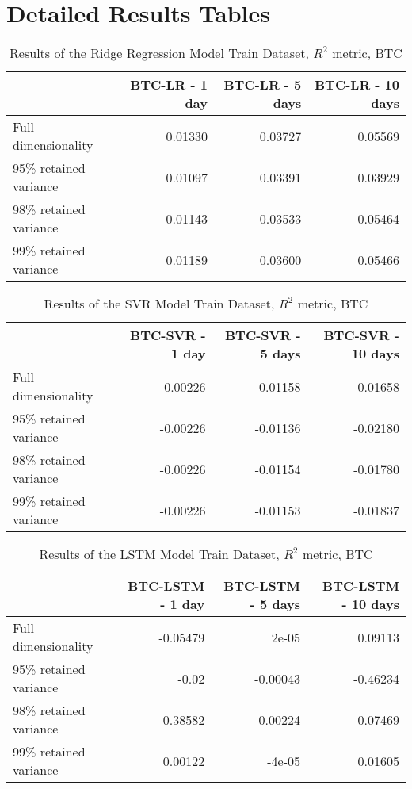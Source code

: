 \chapter{Detailed Results Tables}
\label{app:A}
\begin{table}[htbp]
\centering
\caption{Results of the Ridge Regression Model Train Dataset, $R^2$ metric, BTC}
\begin{tabular}{lrrr}
    \toprule
    {} &  BTC-LR - 1 day &  BTC-LR - 5 days &  BTC-LR - 10 days \\
    \midrule
    Full dimensionality   &         0.01330 &          0.03727 &           0.05569 \\
    95\% retained variance &         0.01097 &          0.03391 &           0.03929 \\
    98\% retained variance &         0.01143 &          0.03533 &           0.05464 \\
    99\% retained variance &         0.01189 &          0.03600 &           0.05466 \\
    \bottomrule
\end{tabular}
\end{table}


\begin{table}[htbp]
    \centering
    \caption{Results of the SVR Model Train Dataset, $R^2$ metric, BTC}
\begin{tabular}{lrrr}
    \toprule
    {} &  BTC-SVR - 1 day &  BTC-SVR - 5 days &  BTC-SVR - 10 days \\
    \midrule
    Full dimensionality   &      -0.00226 &          -0.01158 &           -0.01658 \\
    95\% retained variance &      -0.00226 &          -0.01136 &           -0.02180 \\
    98\% retained variance &      -0.00226 &          -0.01154 &           -0.01780 \\
    99\% retained variance &      -0.00226 &          -0.01153 &           -0.01837 \\
    \bottomrule
\end{tabular}
\end{table}

\begin{table}[htbp]
    \centering
    \caption{Results of the LSTM Model Train Dataset, $R^2$ metric, BTC}
\begin{tabular}{lrrr}
    \toprule
    {} &  BTC-LSTM - 1 day &  BTC-LSTM - 5 days &  BTC-LSTM - 10 days \\
    \midrule
    Full dimensionality   &    -0.05479   &    2e-05       &    0.09113       \\
    95\% retained variance &    -0.02   &        -0.00043   &      -0.46234      \\
    98\% retained variance &    -0.38582   &     -0.00224     &     0.07469       \\
    99\% retained variance &  0.00122    & -4e-05      &      0.01605     \\
    \bottomrule
\end{tabular}
\end{table}

